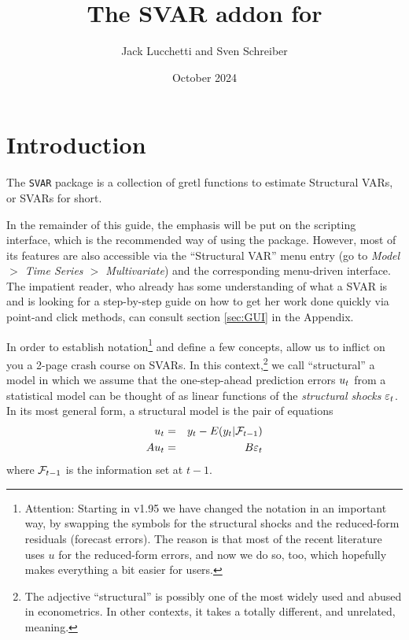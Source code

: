 \documentclass[a4paper,10pt]{article}
\title{The SVAR addon for \app{gretl}}
\author{Jack Lucchetti and Sven Schreiber}
\date{October 2024}
\newcommand{\app}[1]{\textsf{#1}}
\newcounter{script}[section]
\newcommand{\PrE}[1]{\ensuremath u_{#1}} %
\newcommand{\StS}[1]{\ensuremath \varepsilon_{#1}} %
\newcommand{\InfSet}[1]{\ensuremath \mathcal{F}_{#1}}
\begin{document}
\maketitle

\tableofcontents

\clearpage

\section{Introduction}
\label{sec:intro}

The \texttt{SVAR} package is a collection of \app{gretl} functions to
estimate Structural VARs, or SVARs for short. 

In the remainder of this guide, the emphasis will be put on the
scripting interface, which is the recommended way of using the
package. However, most of its features are also accessible via the
``Structural VAR'' menu entry (go to \emph{Model $>$ Time Series $>$
  Multivariate}) and the corresponding menu-driven interface. The
impatient reader, who already has some understanding of what a SVAR is
and is looking for a step-by-step guide on how to get her work done
quickly via point-and click methods, can consult section \ref{sec:GUI}
in the Appendix.

In order to establish notation\footnote{Attention: Starting in v1.95 we have
changed the notation in an important
way, by swapping the symbols for the structural shocks and the reduced-form
residuals (forecast errors). The reason is that most of the recent literature
uses $u$ for the reduced-form errors, and now we do so, too, which hopefully
makes everything a bit easier for users.}
 and define a few concepts, allow us to
inflict on you a 2-page crash course on SVARs.  In this
context,\footnote{The adjective ``structural'' is possibly one of the
  most widely used and abused in econometrics. In other contexts, it
  takes a totally different, and unrelated, meaning.} we call
``structural'' a model in which we assume that the one-step-ahead
prediction errors $\PrE{t}$ from a statistical model can be thought of
as linear functions of the \emph{structural shocks} $\StS{t}$. In its
most general form, a structural model is the pair of equations
\begin{eqnarray}
  \label{eq:one-step-ahead}
  \PrE{t} & = & y_t - E(y_t | \InfSet{t-1}) \\
  \label{eq:PrE-StS-AB}
  A \PrE{t} & = & B \StS{t}
\end{eqnarray}
where $\InfSet{t-1}$ is the information set at $t-1$.
\end{document}
